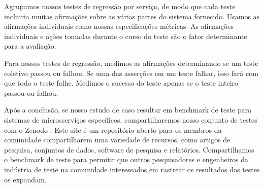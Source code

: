 \begin{tabela}[h]
\begin{tabela}[!t]
\begin{tabela}[h]
\begin{tabela}[h]
Agrupamos nossos testes de regressão por serviço, de modo que cada teste incluiria muitas afirmações sobre as várias partes do sistema fornecido. Usamos as afirmações individuais como nossas especificações métricas. As afirmações individuais e ações tomadas durante o curso do teste são o fator determinante para a avaliação.

Para nossos testes de regressão, medimos as afirmações determinando se um teste coletivo passou ou falhou. Se uma das asserções em um teste falhar, isso fará com que todo o teste falhe. Medimos o sucesso do teste apenas se o teste inteiro passou ou falhou.

Após a conclusão, se nosso estudo de caso resultar em benchmark de teste para sistemas de microsserviços específicos, compartilharemos nosso conjunto de testes com o Zenodo \cite{zenodo_benchmark}. Este site é um repositório aberto para os membros da comunidade compartilharem uma variedade de recursos, como artigos de pesquisa, conjuntos de dados, software de pesquisa e relatórios.
%
Compartilhamos o benchmark de teste para permitir que outros pesquisadores e engenheiros da indústria de teste na comunidade interessados em rastrear os resultados dos testes os expandam.







\end{tabela}
\end{tabela}
\end{tabela}
\end{tabela}
